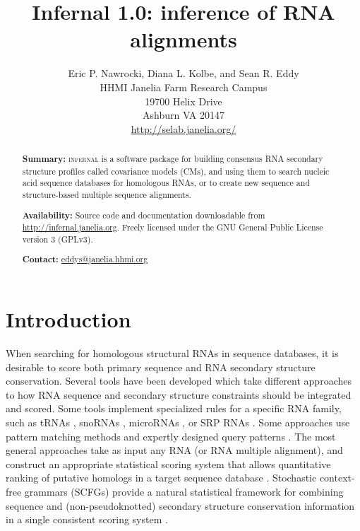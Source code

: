 \documentclass[11pt]{article}
\begin{document}
\title{Infernal 1.0: inference of RNA alignments}
\author{Eric P. Nawrocki, Diana L. Kolbe, and Sean R. Eddy\\
HHMI Janelia Farm Research Campus\\
19700 Helix Drive\\
Ashburn VA 20147\\
\url{http://selab.janelia.org/}\\
}
\maketitle



\begin{abstract}

\textbf{Summary:} \textsc{infernal} is a software package for building
consensus RNA secondary structure profiles called covariance models
(CMs), and using them to search nucleic acid sequence databases for
homologous RNAs, or to create new sequence and structure-based
multiple sequence alignments.

\textbf{Availability:} Source code and documentation downloadable from
\url{http://infernal.janelia.org}. Freely licensed under the GNU
General Public License version 3 (GPLv3).

\textbf{Contact:} \url{eddys@janelia.hhmi.org}

\end{abstract}


\section{Introduction}

When searching for homologous structural RNAs in sequence databases, it is
desirable to score both primary sequence and RNA secondary structure
conservation. Several tools have been developed which take different
approaches to how RNA sequence and secondary structure constraints
should be integrated and scored. Some tools implement specialized
rules for a specific RNA family, such as tRNAs
\citep{LoweEddy97,Laslett04}, snoRNAs \citep{LoweEddy99,Schattner06},
microRNAs \citep{Lai03,Lim03}, or SRP RNAs \citep{Lai03,Lim03}. Some
approaches use pattern matching methods and expertly designed query
patterns \citep{Macke01}. The most general approaches take as input
any RNA (or RNA multiple alignment), and construct an appropriate
statistical scoring system that allows quantitative ranking of
putative homologs in a target sequence database
\citep{Gautheret01,ZhangBafna05}.  Stochastic context-free grammars
(SCFGs) provide a natural statistical framework for combining sequence
and (non-pseudoknotted) secondary structure conservation information
in a single consistent scoring system
\citep{Sakakibara94c,Eddy94,Brown00,Durbin98}.
\end{document}
